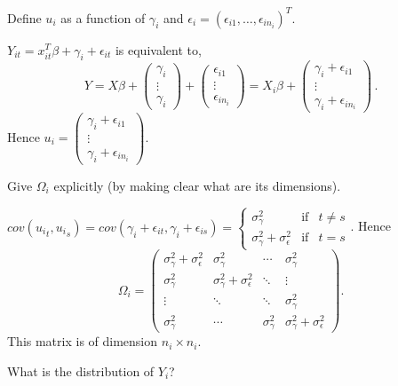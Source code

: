 \documentclass[11pt,a4paper%
addpoints, 
answers%
]{exam}
\begin{document}
\begin{questions}
\question[2] Define $u_i$ as a function of $\gamma_i$ and $\epsilon_i =
(\epsilon_{i1}, \ldots, \epsilon_{in_i})^T$. 
\begin{solution}
	$ Y_{it}=x_{it}^T\beta+\gamma_i+\epsilon_{it}$ is equivalent to, 
	$$Y = X\beta + \left(\begin{array}{c}\gamma_i\\ \vdots \\ \gamma_i\end{array}\right) + \left(\begin{array}{c}\epsilon_{i1}\\ \vdots \\ \epsilon_{i n_i}\end{array}\right) = X_i \beta + \left(\begin{array}{c}\gamma_i + \epsilon_{i1}\\ \vdots \\ \gamma_i + \epsilon_{i n_i}\end{array}\right) \, . $$ Hence $u_i = \left(\begin{array}{c}\gamma_i + \epsilon_{i1}\\ \vdots \\ \gamma_i + \epsilon_{i n_i}\end{array}\right)$.
\end{solution}
\question[2] Give $\Omega_i$ explicitly (by making clear what are its dimensions).
\begin{solution}
	$ cov({u_i}_t, {u_i}_s) = cov(\gamma_i + \epsilon_{it}, \gamma_i + \epsilon_{is}) = \left\{
	\begin{array}{ccl}\sigma_\gamma^2&\text{if}& t\neq s\\ \sigma_\gamma^2 + \sigma_\epsilon^2& \text{if} & t = s \end{array}\right.$. 
	Hence $$ \Omega_i = 
	\left(\begin{array}{cccc} 
	 \sigma_\gamma^2 + \sigma_\epsilon^2 & \sigma_\gamma^2 & \cdots & \sigma_\gamma^2\\
	 \sigma_\gamma^2 & \sigma_\gamma^2 + \sigma_\epsilon^2 & \ddots& \vdots \\
	 \vdots & \ddots& \ddots & 	\sigma_\gamma^2 \\
	 \sigma_\gamma^2  & \cdots & \sigma_\gamma^2 & \sigma_\gamma^2 + \sigma_\epsilon^2
	\end{array}\right).$$ This matrix is of dimension $n_i \times n_i$. 
\end{solution}
\question[2] What is the distribution of $Y_i$?
\begin{solution}

\end{solution}
\end{questions}
\end{document}
